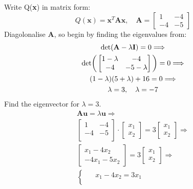 \documentclass[a4paper]{article}
\numberwithin{equation}{section} %
\begin{document}
\begin{TheSolution}
Write Q(\textbf{x}) in matrix form:
\begin{equation*}
Q(\textbf{x}) = \textbf{x}^{T}\textbf{Ax},\quad \textbf{A}=\begin{bmatrix}
1&		-4\\
-4&		-5
\end{bmatrix}
\end{equation*}
Diagolonalise \textbf{A}, so begin by finding the eigenvalues from:
\begin{equation*}
\begin{gathered}
\textup{det}(\textbf{A}-\lambda \textbf{I}) = 0\Longrightarrow \\
\textup{det}\bigg( \begin{bmatrix}
1-\lambda	&	-4\\
-4			&	-5-\lambda\\
\end{bmatrix} \bigg)=0\Longrightarrow \\
(1-\lambda)(5+\lambda)+16=0\Longrightarrow \\
\lambda=3,\quad \lambda=-7
\end{gathered}
\end{equation*}
Find the eigenvector for $\lambda=3$.
\begin{equation*}
  \begin{gathered}
    \textbf{Au}=\lambda \textbf{u}\Longrightarrow \\
    \begin{bmatrix}
    1	&	-4\\
    -4			&	-5\\
    \end{bmatrix}\cdot \begin{bmatrix}x_{1}\\x_{2} \end{bmatrix}=3\begin{bmatrix}x_{1}\\x_{2} \end{bmatrix}\Longrightarrow \\
    \begin{bmatrix}x_{1}-4x_{2}\\-4x_{1}-5x_{2} \end{bmatrix}=3\begin{bmatrix}x_{1}\\x_{2}\end{bmatrix}\Longrightarrow \\
    \begin{cases}
    \quad \;x_{1}-4x_{2}=3x_{1}\\

\end{cases}
\end{gathered}
\end{equation*}
\end{TheSolution}
\end{document}
